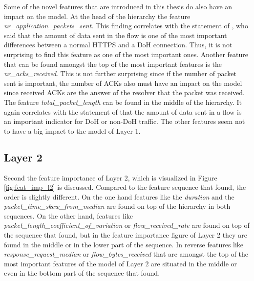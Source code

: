 Some of the novel features that are introduced in this thesis do also have an impact on the model. At the head of the hierarchy the feature \textit{nr\_application\_packets\_sent}. This finding correlates with the statement of \cite{VeshkinEtAl_DoHInsightML}, who said that the amount of data sent in the flow is one of the most important differences between a normal HTTPS and a DoH connection. Thus, it is not surprising to find this feature as one of the most important ones. Another feature that can be found amongst the top of the most important features is the \textit{nr\_acks\_received}. This is not further surprising since if the number of packet sent is important, the number of ACKs also must have an impact on the model since received ACKs are the answer of the resolver that the packet was received. The feature \textit{total\_packet\_length} can be found in the middle of the hierarchy. It again correlates with the statement of \cite{VeshkinEtAl_DoHInsightML} that the amount of data sent in a flow is an important indicator for DoH or non-DoH traffic. The other features seem not to have a big impact to the model of Layer 1.

\subsection{Layer 2}
Second the feature importance of Layer 2, which is visualized in Figure \ref{fig:feat_imp_l2} is discussed. Compared to the feature sequence that \cite{BehnkeEtAl_FeatureEngineeringMLModelMaliciusDoHTraffic} found, the order is slightly different. On the one hand features like the \textit{duration} and the \textit{packet\_time\_skew\_from\_median} are found on top of the hierarchy in both sequences. On the other hand, features like \textit{packet\_length\_coefficient\_of\_variation} or \textit{flow\_received\_rate} are found on top of the sequence that \cite{BehnkeEtAl_FeatureEngineeringMLModelMaliciusDoHTraffic} found, but in the feature importance figure of Layer 2 they are found in the middle or in the lower part of the sequence. In reverse features like \textit{response\_request\_median} or \textit{flow\_bytes\_received} that are amongst the top of the most important features of the model of Layer 2 are situated in the middle or even in the bottom part of the sequence that \cite{BehnkeEtAl_FeatureEngineeringMLModelMaliciusDoHTraffic} found.

